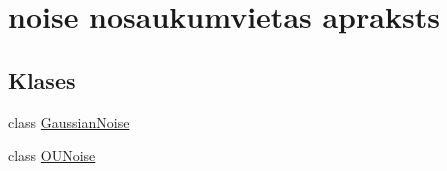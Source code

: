 \hypertarget{namespacenoise}{}\section{noise nosaukumvietas apraksts}
\label{namespacenoise}
\subsection*{Klases}
\begin{DoxyCompactItemize}
\item 
class \hyperlink{classnoise_1_1_gaussian_noise}{Gaussian\+Noise}
\item 
class \hyperlink{classnoise_1_1_o_u_noise}{O\+U\+Noise}
\end{DoxyCompactItemize}
